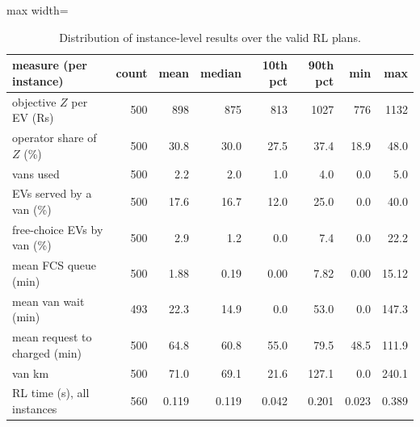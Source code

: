 \begin{table}[H]\centering
\small
\caption{Distribution of instance-level results over the valid RL plans.}\label{tab:inststats}
\begin{adjustbox}{max width=\textwidth}\begin{tabular}{lrrrrrrr}\toprule
measure (per instance) & count & mean & median & 10th pct & 90th pct & min & max \\ \midrule
objective $Z$ per EV (Rs) & 500 & 898 & 875 & 813 & 1027 & 776 & 1132 \\
operator share of $Z$ (\%) & 500 & 30.8 & 30.0 & 27.5 & 37.4 & 18.9 & 48.0 \\
vans used & 500 & 2.2 & 2.0 & 1.0 & 4.0 & 0.0 & 5.0 \\
EVs served by a van (\%) & 500 & 17.6 & 16.7 & 12.0 & 25.0 & 0.0 & 40.0 \\
free-choice EVs by van (\%) & 500 & 2.9 & 1.2 & 0.0 & 7.4 & 0.0 & 22.2 \\
mean FCS queue (min) & 500 & 1.88 & 0.19 & 0.00 & 7.82 & 0.00 & 15.12 \\
mean van wait (min) & 493 & 22.3 & 14.9 & 0.0 & 53.0 & 0.0 & 147.3 \\
mean request to charged (min) & 500 & 64.8 & 60.8 & 55.0 & 79.5 & 48.5 & 111.9 \\
van km & 500 & 71.0 & 69.1 & 21.6 & 127.1 & 0.0 & 240.1 \\
RL time (s), all instances & 560 & 0.119 & 0.119 & 0.042 & 0.201 & 0.023 & 0.389 \\
\bottomrule\end{tabular}\end{adjustbox}\end{table}
